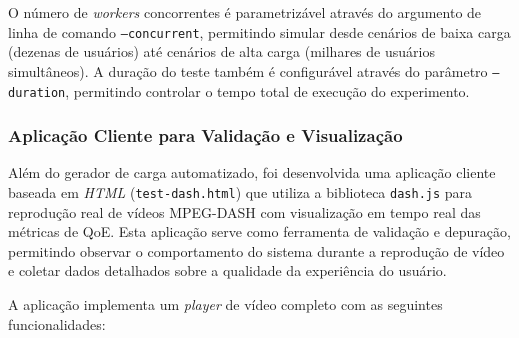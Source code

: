 O número de \textit{workers} concorrentes é parametrizável através do argumento de linha de comando \texttt{--concurrent}, permitindo simular desde cenários de baixa carga (dezenas de usuários) até cenários de alta carga (milhares de usuários simultâneos). A duração do teste também é configurável através do parâmetro \texttt{--duration}, permitindo controlar o tempo total de execução do experimento.

\subsubsection{Aplicação Cliente para Validação e Visualização}

Além do gerador de carga automatizado, foi desenvolvida uma aplicação cliente baseada em \textit{HTML} (\texttt{test-dash.html}) que utiliza a biblioteca \texttt{dash.js} para reprodução real de vídeos MPEG-DASH com visualização em tempo real das métricas de QoE. Esta aplicação serve como ferramenta de validação e depuração, permitindo observar o comportamento do sistema durante a reprodução de vídeo e coletar dados detalhados sobre a qualidade da experiência do usuário.

A aplicação implementa um \textit{player} de vídeo completo com as seguintes funcionalidades:

